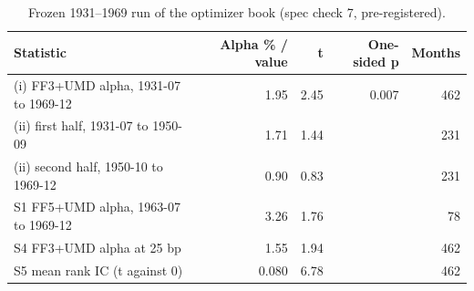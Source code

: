 \begin{table}[htbp]
\centering
\footnotesize
\caption{Frozen 1931--1969 run of the optimizer book (spec check 7, pre-registered).}
\label{tab:m7_frozen}
\begin{tabular}{lrrrr}
\toprule
Statistic & Alpha \% / value & t & One-sided p & Months \\
\midrule
(i) FF3+UMD alpha, 1931-07 to 1969-12 & 1.95 & 2.45 & 0.007 & 462 \\
(ii) first half, 1931-07 to 1950-09 & 1.71 & 1.44 &  & 231 \\
(ii) second half, 1950-10 to 1969-12 & 0.90 & 0.83 &  & 231 \\
S1 FF5+UMD alpha, 1963-07 to 1969-12 & 3.26 & 1.76 &  & 78 \\
S4 FF3+UMD alpha at 25 bp & 1.55 & 1.94 &  & 462 \\
S5 mean rank IC (t against 0) & 0.080 & 6.78 &  & 462 \\
\bottomrule
\end{tabular}
\par{}
\end{table}

